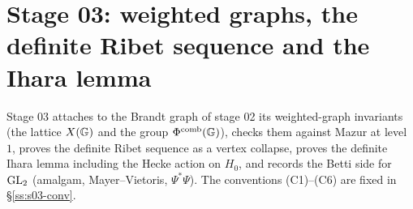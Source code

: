 \section*{Stage 03: weighted graphs, the definite Ribet sequence and the Ihara lemma}\label{sec:stage-03}

Stage 03 attaches to the Brandt graph of stage 02 its weighted-graph invariants (the lattice $X(\mathbb{G})$ and the group
$\Phi^{\mathrm{comb}}(\mathbb{G})$), checks them against Mazur at level $1$, proves the definite Ribet sequence as a vertex collapse, proves the
definite Ihara lemma including the Hecke action on $H_0$, and records the Betti side for $\mathrm{GL}_2$ (amalgam,
Mayer--Vietoris, $\Psi^*\Psi$). The conventions (C1)--(C6) are fixed in \S\ref{ss:s03-conv}.

